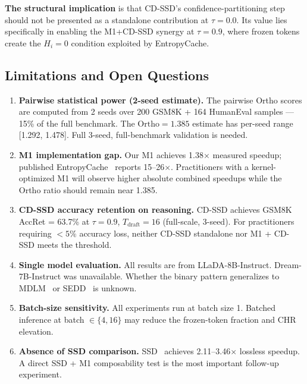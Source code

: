 \documentclass{article}
\newcommand{\ortho}{\text{Ortho}}
\newcommand{\Tdraft}{T_{\text{draft}}}
\begin{document}
\textbf{The structural implication} is that CD-SSD's confidence-partitioning step should not be
presented as a standalone contribution at $\tau=0.0$. Its value lies specifically in enabling the
M1+CD-SSD synergy at $\tau=0.9$, where frozen tokens create the $H_i=0$ condition exploited by
EntropyCache.

\subsection{Limitations and Open Questions}
\label{sec:limitations}

\begin{enumerate}
\item \textbf{Pairwise statistical power (2-seed estimate).} The pairwise Ortho scores are computed
  from 2 seeds over 200 GSM8K + 164 HumanEval samples --- 15\% of the full benchmark. The
  $\ortho = 1.385$ estimate has per-seed range [1.292, 1.478]. Full 3-seed, full-benchmark
  validation is needed.

\item \textbf{M1 implementation gap.} Our M1 achieves 1.38$\times$ measured speedup; published
  EntropyCache~\cite{entropycache} reports 15--26$\times$. Practitioners with a kernel-optimized M1
  will observe higher absolute combined speedups while the Ortho ratio should remain near 1.385.

\item \textbf{CD-SSD accuracy retention on reasoning.} CD-SSD achieves GSM8K AccRet = 63.7\% at
  $\tau = 0.9$, $\Tdraft = 16$ (full-scale, 3-seed). For practitioners requiring $< 5\%$ accuracy
  loss, neither CD-SSD standalone nor M1 + CD-SSD meets the threshold.

\item \textbf{Single model evaluation.} All results are from LLaDA-8B-Instruct. Dream-7B-Instruct
  was unavailable. Whether the binary pattern generalizes to MDLM~\cite{mdlm} or SEDD~\cite{sedd}
  is unknown.

\item \textbf{Batch-size sensitivity.} All experiments run at batch size 1. Batched inference at
  batch $\in \{4, 16\}$ may reduce the frozen-token fraction and CHR elevation.

\item \textbf{Absence of SSD comparison.} SSD~\cite{ssd} achieves 2.11--3.46$\times$ lossless
  speedup. A direct SSD + M1 composability test is the most important follow-up experiment.
\end{enumerate}
\end{document}
